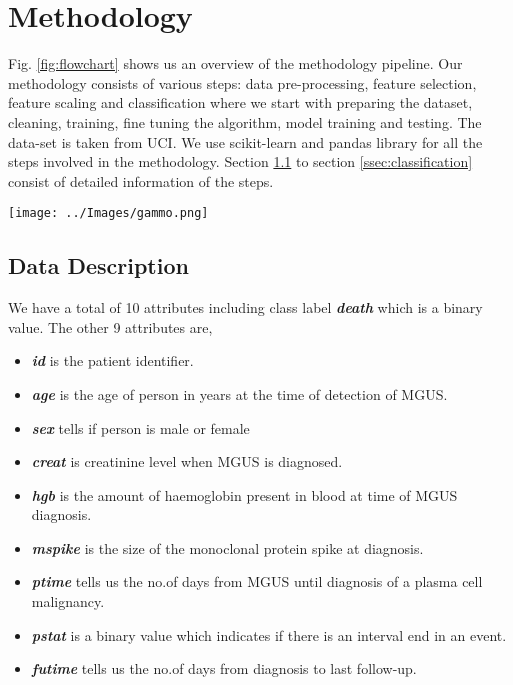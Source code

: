 \documentclass[conference]{IEEEtran}
\begin{document}
\section{Methodology}                                                                     
Fig. \ref{fig:flowchart} shows us an overview of the methodology pipeline. Our methodology consists of various steps: data pre-processing, feature selection, feature scaling and classification where we start with preparing the dataset, cleaning, training, fine tuning the algorithm, model training and testing. The data-set is taken from UCI\cite{uci}. We use scikit-learn \cite{scikit} and pandas library for all the steps involved in the methodology. Section \ref{ssec:describe} to section \ref{ssec:classification} consist of detailed information of the steps.     
\par              
\begin{figure*}[t]
	\centering
	\texttt{[image: ../Images/gammo.png]}
	\caption{Methodology Pipeline Overview}
	\label{fig:flowchart}
\end{figure*}

\subsection{Data Description}
\label{ssec:describe}
We have a total of 10 attributes including class label \textbf{\textit{death}} which is a binary value. The other 9 attributes are,  

\begin{itemize}
\item \textbf{\textit{id}} is the patient identifier.
\item \textbf{\textit{age}} is the age of person in years at the time of detection of MGUS. 
\item \textbf{\textit{sex}} tells if person is male or female
\item \textbf{\textit{creat}} is creatinine level when MGUS is diagnosed.
\item \textbf{\textit{hgb}} is the amount of haemoglobin present in blood at time of MGUS diagnosis.
\item \textbf{\textit{mspike}} is the size of the monoclonal protein spike at diagnosis.
\item \textbf{\textit{ptime}} tells us the no.of days from MGUS until diagnosis of a plasma cell malignancy.
\item \textbf{\textit{pstat}} is a binary value which indicates if there is an interval end in an event.
\item \textbf{\textit{futime}} tells us the no.of days from diagnosis to last follow-up.
\end{itemize}
\end{document}

